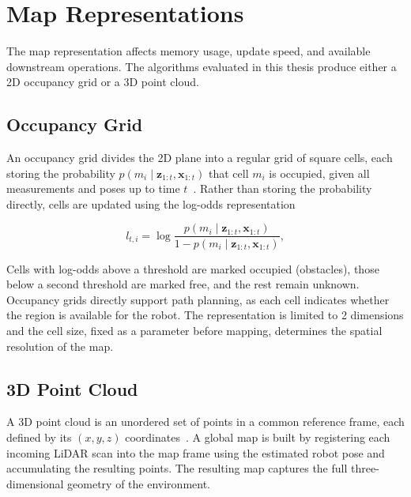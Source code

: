 \section{Map Representations}
\label{sec:map_representations}


The map representation affects memory usage, update speed, and available
downstream operations. The algorithms evaluated in this thesis produce either
a 2D occupancy grid or a 3D point cloud.

\subsection{Occupancy Grid}

An occupancy grid divides the 2D plane into a regular grid of square cells, each
storing the probability $p(m_i \mid \mathbf{z}_{1:t}, \mathbf{x}_{1:t})$ that
cell $m_i$ is occupied, given all measurements and poses up to time
$t$~\cite{thrun2005probabilistic}.
Rather than storing the probability directly, cells are updated using the log-odds
representation

\begin{equation}
  l_{t,i} = \log \frac{p(m_i \mid \mathbf{z}_{1:t}, 
  \mathbf{x}_{1:t})}{1 - p(m_i \mid \mathbf{z}_{1:t}, \mathbf{x}_{1:t})},
  \label{eq:log_odds}
\end{equation}


Cells with log-odds above a threshold are marked occupied (obstacles), those below a
second threshold are marked free, and the rest remain unknown.
Occupancy grids directly support path planning, as each cell indicates whether
the region is available for the robot. The representation is limited to 2 dimensions 
and the cell size, fixed as a parameter before
mapping, determines the spatial resolution of the map.

\subsection{3D Point Cloud}

A 3D point cloud is an unordered set of points in a common reference frame,
each defined by its $(x, y, z)$ coordinates~\cite{cadena2016past}.
A global map is built by registering each incoming LiDAR scan into the map
frame using the estimated robot pose and accumulating the resulting points.
The resulting map captures the full three-dimensional geometry of the environment.

